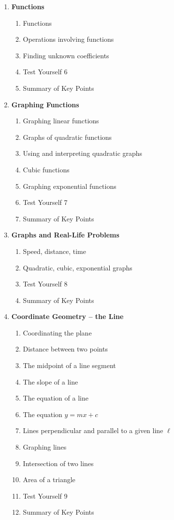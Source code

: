 \documentclass{article}
\begin{document}
\begin{enumerate}
    \item \textbf{Functions}
    \begin{enumerate}
        \item Functions
        \item Operations involving functions
        \item Finding unknown coefficients
        \item Test Yourself 6
        \item Summary of Key Points
    \end{enumerate}

    \item \textbf{Graphing Functions}
    \begin{enumerate}
        \item Graphing linear functions
        \item Graphs of quadratic functions
        \item Using and interpreting quadratic graphs
        \item Cubic functions
        \item Graphing exponential functions
        \item Test Yourself 7
        \item Summary of Key Points
    \end{enumerate}

    \item \textbf{Graphs and Real-Life Problems}
    \begin{enumerate}
        \item Speed, distance, time
        \item Quadratic, cubic, exponential graphs
        \item Test Yourself 8
        \item Summary of Key Points
    \end{enumerate}

    \item \textbf{Coordinate Geometry – the Line}
    \begin{enumerate}
        \item Coordinating the plane
        \item Distance between two points
        \item The midpoint of a line segment
        \item The slope of a line
        \item The equation of a line
        \item The equation $y = mx + c$
        \item Lines perpendicular and parallel to a given line $\ell$
        \item Graphing lines
        \item Intersection of two lines
        \item Area of a triangle
        \item Test Yourself 9
        \item Summary of Key Points
    \end{enumerate}


\end{enumerate}
\end{document}
